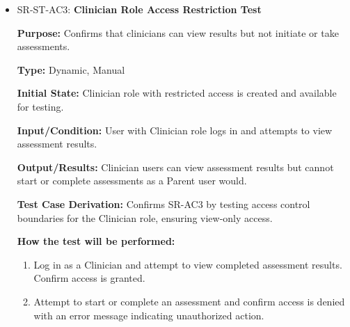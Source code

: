 \documentclass[12pt, titlepage]{article}
\begin{document}
\begin{itemize}
  \item SR-ST-AC3: \textbf{Clinician Role Access Restriction Test}
  \begin{mdframed}[linewidth=0.5mm]
      \textbf{Purpose:} Confirms that clinicians can view results but not initiate or take assessments. \par
      \textbf{Type:} Dynamic, Manual \par
      \textbf{Initial State:} Clinician role with restricted access is created and available for testing. \par
      \textbf{Input/Condition:} User with Clinician role logs in and attempts to view assessment results. \par
      \textbf{Output/Results:} Clinician users can view assessment results but cannot start or complete assessments as a Parent user would. \par
      \textbf{Test Case Derivation:} Confirms SR-AC3 by testing access control boundaries for the Clinician role, ensuring view-only access. \par
      \textbf{How the test will be performed:}
      \begin{enumerate}[noitemsep]
        \item Log in as a Clinician and attempt to view completed assessment results. Confirm access is granted.
        \item Attempt to start or complete an assessment and confirm access is denied with an error message indicating unauthorized action.
      \end{enumerate}
  \end{mdframed}


\end{itemize}
\end{document}
